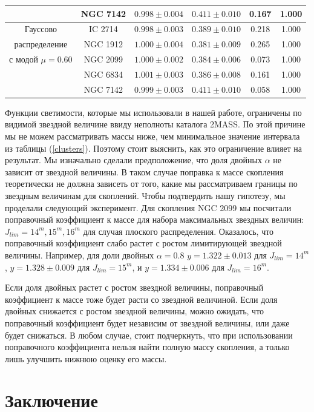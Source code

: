 \documentclass[a4paper,12pt]{article}
\begin{document}
\begin{table}[h!]
\begin{tabular}{|c|c|c|c|c|c|}
					&NGC 7142&$0.998 \pm 0.004$&$0.411 \pm 0.010$&0.167&1.000\\
			\hline
				Гауссово &IC 2714&$0.998 \pm 0.003$&$0.389 \pm 0.010$&0.218&1.000\\
				распределение &NGC 1912&$1.000 \pm 0.004$&$0.381 \pm 0.009$&0.265&1.000\\
				с модой $\mu = 0.60$&NGC 2099&$1.000 \pm 0.002$&$0.384 \pm 0.006$&0.073&1.000\\
					&NGC 6834&$1.001 \pm 0.003$&$0.386 \pm 0.008$&0.161&1.000\\
					&NGC 7142&$0.999 \pm 0.003$&$0.411 \pm 0.010$&0.058&1.000\\
			\hline
		\end{tabular}
\label{results_t}
\end{table}
 
Функции светимости, которые мы использовали в нашей работе, ограничены по видимой звездной величине ввиду неполноты каталога 2MASS. По этой причине мы не можем рассматривать массы ниже, чем минимальное значение интервала из таблицы (\ref{clusters}). Поэтому стоит выяснить, как это ограничение влияет на результат. Мы изначально сделали предположение, что доля двойных $\alpha$ не зависит от звездной величины. В таком случае поправка к массе скопления теоретически не должна зависеть от того, какие мы рассматриваем границы по звездным величинам для скоплений. Чтобы подтвердить нашу гипотезу, мы проделали следующий эксперимент. Для скопления NGC 2099 мы посчитали поправочный коэффициент к массе для набора максимальных звездных величин: $J_{lim} = 14^m, 15^m, 16^m$ для случая плоского распределения. Оказалось, что поправочный коэффициент слабо растет с ростом лимитирующей звездной величины. Например, для доли двойных $\alpha = 0.8$ $y = 1.322 \pm 0.013$ для $J_{lim} = 14^m$, $y = 1.328 \pm 0.009$ для $J_{lim} = 15^m$, и $y = 1.334 \pm 0.006$ для $J_{lim}  = 16^m$.


Если доля двойных растет с ростом звездной величины, поправочный коэффициент к массе тоже будет расти со звездной величиной. Если доля двойных снижается с ростом звездной величины, можно ожидать, что поправочный коэффициент будет независим от звездной величины, или даже будет снижаться.
В любом случае, стоит подчеркнуть, что при использовании поправочного коэффициента нельзя найти полную массу скопления, а только лишь улучшить нижнюю оценку его массы.

\section*{Заключение}
\end{document}
